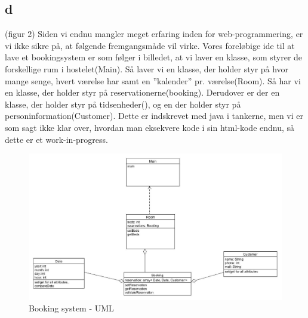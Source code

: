 \documentclass[12pt,a4paper]{article}
\begin{document}
\subsection{d}
(figur 2) Siden vi endnu mangler meget erfaring inden for web-programmering, er vi ikke sikre på, at følgende fremgangsmåde vil virke. Vores foreløbige ide til at lave et bookingsystem er som følger i billedet, at vi laver en klasse, som styrer de forskellige rum i hostelet(Main). Så laver vi en klasse, der holder styr på hvor mange senge, hvert værelse har samt en ”kalender” pr. værelse(Room). Så har vi en klasse, der holder styr på reservationerne(booking). Derudover er der en klasse, der holder styr på tidsenheder(), og en der holder styr på personinformation(Customer). Dette er indskrevet med java i tankerne, men vi er som sagt ikke klar over, hvordan man eksekvere kode i sin html-kode endnu, så dette er et work-in-progress.\\
\begin{figure}[H]
\includegraphics[scale=0.4]{unfinished.jpg}
\caption{Booking system - UML}
\end{figure}
\end{document}
